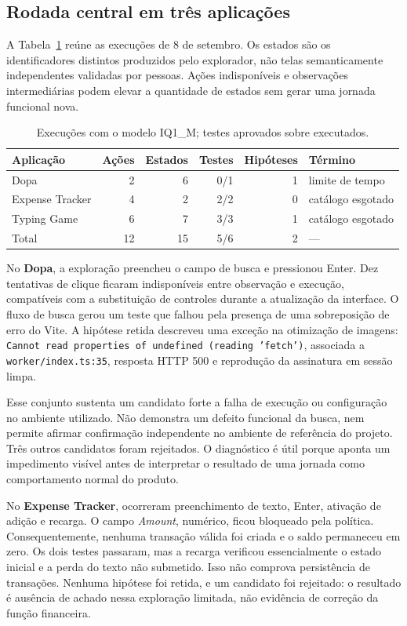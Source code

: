 \documentclass[12pt]{article}
\begin{document}
\subsection{Rodada central em três aplicações}
A Tabela~\ref{tab:results} reúne as execuções de 8 de setembro. Os estados são os identificadores distintos produzidos pelo explorador, não telas semanticamente independentes validadas por pessoas. Ações indisponíveis e observações intermediárias podem elevar a quantidade de estados sem gerar uma jornada funcional nova.

\begin{table}[ht]
\centering
\caption{Execuções com o modelo IQ1\_M; testes aprovados sobre executados.}
\label{tab:results}
\small
\begin{tabular}{lrrrrl}
\toprule
Aplicação & Ações & Estados & Testes & Hipóteses & Término\\
\midrule
Dopa & 2 & 6 & 0/1 & 1 & limite de tempo\\
Expense Tracker & 4 & 2 & 2/2 & 0 & catálogo esgotado\\
Typing Game & 6 & 7 & 3/3 & 1 & catálogo esgotado\\
\midrule
Total & 12 & 15 & 5/6 & 2 & ---\\
\bottomrule
\end{tabular}
\end{table}

No \textbf{Dopa}, a exploração preencheu o campo de busca e pressionou Enter. Dez tentativas de clique ficaram indisponíveis entre observação e execução, compatíveis com a substituição de controles durante a atualização da interface. O fluxo de busca gerou um teste que falhou pela presença de uma sobreposição de erro do Vite. A hipótese retida descreveu uma exceção na otimização de imagens: \texttt{Cannot read properties of undefined (reading 'fetch')}, associada a \texttt{worker/index.ts:35}, resposta HTTP 500 e reprodução da assinatura em sessão limpa.

Esse conjunto sustenta um candidato forte a falha de execução ou configuração no ambiente utilizado. Não demonstra um defeito funcional da busca, nem permite afirmar confirmação independente no ambiente de referência do projeto. Três outros candidatos foram rejeitados. O diagnóstico é útil porque aponta um impedimento visível antes de interpretar o resultado de uma jornada como comportamento normal do produto.

No \textbf{Expense Tracker}, ocorreram preenchimento de texto, Enter, ativação de adição e recarga. O campo \textit{Amount}, numérico, ficou bloqueado pela política. Consequentemente, nenhuma transação válida foi criada e o saldo permaneceu em zero. Os dois testes passaram, mas a recarga verificou essencialmente o estado inicial e a perda do texto não submetido. Isso não comprova persistência de transações. Nenhuma hipótese foi retida, e um candidato foi rejeitado: o resultado é ausência de achado nessa exploração limitada, não evidência de correção da função financeira.
\end{document}
